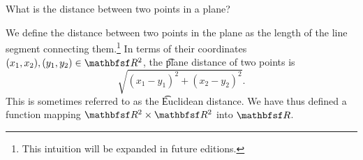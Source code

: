 

What is the distance between two points in a plane?


We define the distance between two points in the plane as the length of the line segment connecting them.\footnote{This intuition will be expanded in future editions.}
In terms of their coordinates $(x_1, x_2), (y_1, y_2) \in \R^2$, the \t{plane distance} of two points is
\[
  \sqrt{(x_1 - y_1)^2 + (x_2 - y_2)^2}.
\]
This is sometimes referred to as the \t{Euclidean distance}.
We have thus defined a function mapping $\R^2 \times \R^2$ into $\R$.

\blankpage
